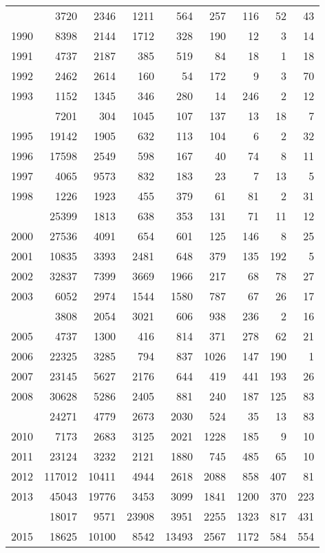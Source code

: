\documentclass[
]{article}
\begin{document}
\begin{longtable}[t]{lrrrrrrrr}
\endfoot
\bottomrule
\endlastfoot
1989 & 3720 & 2346 & 1211 & 564 & 257 & 116 & 52 & 43\\
1990 & 8398 & 2144 & 1712 & 328 & 190 & 12 & 3 & 14\\
1991 & 4737 & 2187 & 385 & 519 & 84 & 18 & 1 & 18\\
1992 & 2462 & 2614 & 160 & 54 & 172 & 9 & 3 & 70\\
1993 & 1152 & 1345 & 346 & 280 & 14 & 246 & 2 & 12\\
\addlinespace
1994 & 7201 & 304 & 1045 & 107 & 137 & 13 & 18 & 7\\
1995 & 19142 & 1905 & 632 & 113 & 104 & 6 & 2 & 32\\
1996 & 17598 & 2549 & 598 & 167 & 40 & 74 & 8 & 11\\
1997 & 4065 & 9573 & 832 & 183 & 23 & 7 & 13 & 5\\
1998 & 1226 & 1923 & 455 & 379 & 61 & 81 & 2 & 31\\
\addlinespace
1999 & 25399 & 1813 & 638 & 353 & 131 & 71 & 11 & 12\\
2000 & 27536 & 4091 & 654 & 601 & 125 & 146 & 8 & 25\\
2001 & 10835 & 3393 & 2481 & 648 & 379 & 135 & 192 & 5\\
2002 & 32837 & 7399 & 3669 & 1966 & 217 & 68 & 78 & 27\\
2003 & 6052 & 2974 & 1544 & 1580 & 787 & 67 & 26 & 17\\
\addlinespace
2004 & 3808 & 2054 & 3021 & 606 & 938 & 236 & 2 & 16\\
2005 & 4737 & 1300 & 416 & 814 & 371 & 278 & 62 & 21\\
2006 & 22325 & 3285 & 794 & 837 & 1026 & 147 & 190 & 1\\
2007 & 23145 & 5627 & 2176 & 644 & 419 & 441 & 193 & 26\\
2008 & 30628 & 5286 & 2405 & 881 & 240 & 187 & 125 & 83\\
\addlinespace
2009 & 24271 & 4779 & 2673 & 2030 & 524 & 35 & 13 & 83\\
2010 & 7173 & 2683 & 3125 & 2021 & 1228 & 185 & 9 & 10\\
2011 & 23124 & 3232 & 2121 & 1880 & 745 & 485 & 65 & 10\\
2012 & 117012 & 10411 & 4944 & 2618 & 2088 & 858 & 407 & 81\\
2013 & 45043 & 19776 & 3453 & 3099 & 1841 & 1200 & 370 & 223\\
\addlinespace
2014 & 18017 & 9571 & 23908 & 3951 & 2255 & 1323 & 817 & 431\\
2015 & 18625 & 10100 & 8542 & 13493 & 2567 & 1172 & 584 & 554\\

\end{longtable}
\end{document}

